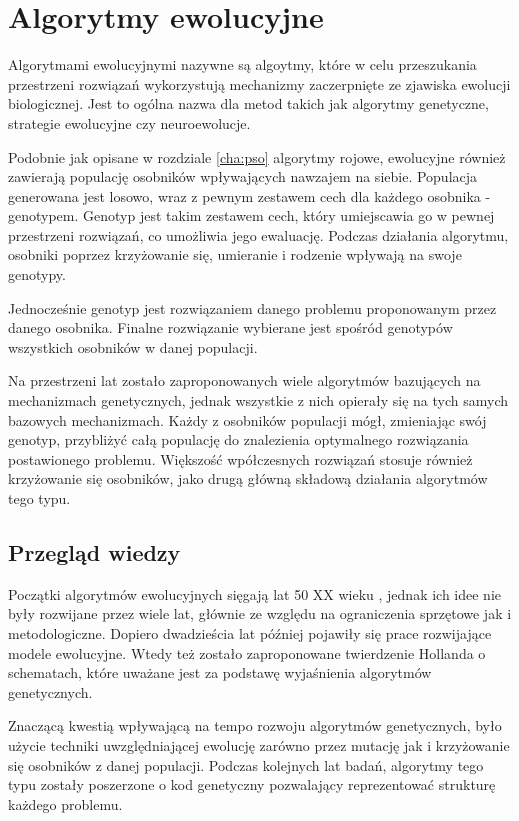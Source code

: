 \chapter{Algorytmy ewolucyjne}
\label{cha:genetyczne}

Algorytmami ewolucyjnymi nazywne są algoytmy, które w celu przeszukania przestrzeni rozwiązań  wykorzystują mechanizmy zaczerpnięte ze zjawiska ewolucji biologicznej. Jest to ogólna nazwa dla metod takich jak algorytmy genetyczne, strategie ewolucyjne czy neuroewolucje. 

Podobnie jak opisane w rozdziale \ref{cha:pso} algorytmy rojowe, ewolucyjne również zawierają populację osobników wpływających nawzajem na siebie. Populacja generowana jest losowo, wraz z pewnym zestawem cech dla każdego osobnika - genotypem. Genotyp jest takim zestawem cech, który umiejscawia go w pewnej przestrzeni rozwiązań, co umożliwia jego ewaluację. Podczas działania algorytmu, osobniki poprzez krzyżowanie się, umieranie i rodzenie wpływają na swoje genotypy. 

Jednocześnie genotyp jest rozwiązaniem danego problemu proponowanym przez danego osobnika. Finalne rozwiązanie wybierane jest spośród genotypów wszystkich osobników w danej populacji.

Na przestrzeni lat zostało zaproponowanych wiele algorytmów bazujących na mechanizmach genetycznych, jednak wszystkie z nich opierały się na tych samych bazowych mechanizmach. Każdy z osobników populacji mógł, zmieniając swój genotyp, przybliżyć całą populację do znalezienia optymalnego rozwiązania postawionego problemu. Większość wpółczesnych rozwiązań stosuje również krzyżowanie się osobników, jako drugą główną składową działania algorytmów tego typu.

\section{Przegląd wiedzy}
\label{sec:historiagenetycznych}
Początki algorytmów ewolucyjnych sięgają lat 50 XX wieku \cite{GA1}, jednak ich idee nie były rozwijane przez wiele lat, głównie ze względu na ograniczenia sprzętowe jak i metodologiczne. Dopiero dwadzieścia lat później \cite{GA2} pojawiły się prace rozwijające modele ewolucyjne. Wtedy też zostało zaproponowane twierdzenie Hollanda o schematach, które uważane jest za podstawę wyjaśnienia algorytmów genetycznych. 

Znaczącą kwestią wpływającą na tempo rozwoju algorytmów genetycznych, było użycie techniki uwzględniającej ewolucję zarówno przez mutację jak i krzyżowanie się osobników z danej populacji. Podczas kolejnych lat badań, algorytmy tego typu zostały poszerzone o kod genetyczny pozwalający reprezentować strukturę każdego problemu.

